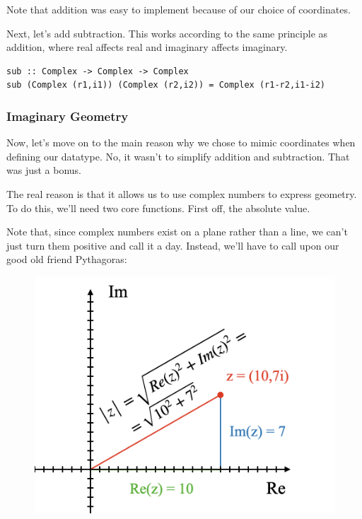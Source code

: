 Note that addition was easy to implement because of our choice of coordinates.  

Next, let's add subtraction. This works according to the same principle as addition, where real affects real and imaginary affects imaginary.   
\begin{verbatim}
sub :: Complex -> Complex -> Complex
sub (Complex (r1,i1)) (Complex (r2,i2)) = Complex (r1-r2,i1-i2)
\end{verbatim}

\subsubsection{Imaginary Geometry}

Now, let's move on to the main reason why we chose to mimic coordinates when defining our datatype. No, it wasn't to simplify addition and subtraction. That was just a bonus.

The real reason is that it allows us to use complex numbers to express geometry. To do this, we'll need two core functions. First off, the absolute value.

Note that, since complex numbers exist on a plane rather than a line, we can't just turn them positive and call it a day. Instead, we'll have to call upon our good old friend Pythagoras:

\begin{figure}[h!]
    \centering
    \includegraphics[scale= 0.4]{abs.png}
    \caption{}
    \label{abs}
\end{figure}

